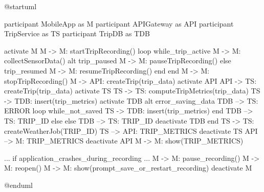 @startuml

participant MobileApp as M
participant APIGateway as API
participant TripService as TS
participant TripDB as TDB

activate M
M -> M: startTripRecording()
loop while_trip_active
M -> M: collectSensorData()
alt trip_paused
M -> M: pauseTripRecording()
else trip_resumed
M -> M: resumeTripRecording()
end
end
M -> M: stopTripRecording()
M -> API: createTrip(trip_data)
activate API
API -> TS: createTrip(trip_data)
activate TS
TS -> TS: computeTripMetrics(trip_data)
TS -> TDB: insert(trip_metrics)
activate TDB
alt error_saving_data
TDB --> TS: ERROR
loop while_not_saved
TS -> TDB: insert(trip_metrics)
end
TDB --> TS: TRIP_ID
else else 
TDB --> TS: TRIP_ID
deactivate TDB
end
TS -> TS: createWeatherJob(TRIP_ID)
TS --> API: TRIP_METRICS
deactivate TS
API --> M: TRIP_METRICS
deactivate API
M -> M: show(TRIP_METRICS)

... if application_crashes_during_recording ...
M -> M: pause_recording()
M -> M: reopen()
M -> M: show(prompt_save_or_restart_recording)
deactivate M

@enduml